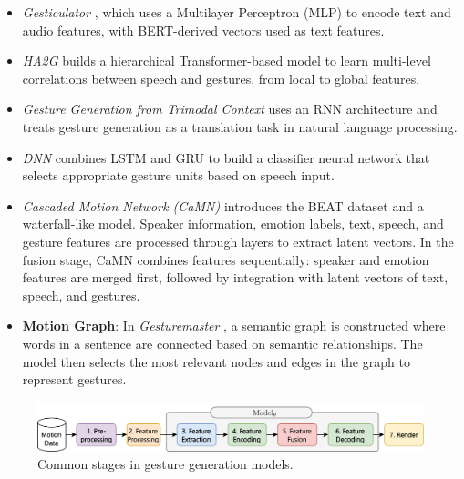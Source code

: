 \begin{itemize}
	\item \textit{Gesticulator} \cite{kucherenko2020gesticulator}, which uses a Multilayer Perceptron (MLP) to encode text and audio features, with BERT-derived vectors used as text features.
	
	\item \textit{HA2G} \cite{liu2022learning} builds a hierarchical Transformer-based model to learn multi-level correlations between speech and gestures, from local to global features.
	
	\item \textit{Gesture Generation from Trimodal Context} \cite{yoon2020speech} uses an RNN architecture and treats gesture generation as a translation task in natural language processing.
	
	\item \textit{DNN} \cite{chiu2015predicting} combines LSTM and GRU to build a classifier neural network that selects appropriate gesture units based on speech input.
	
	\item \textit{Cascaded Motion Network (CaMN)} \cite{liu2022beat} introduces the BEAT dataset and a waterfall-like model. Speaker information, emotion labels, text, speech, and gesture features are processed through layers to extract latent vectors. In the fusion stage, CaMN combines features sequentially: speaker and emotion features are merged first, followed by integration with latent vectors of text, speech, and gestures.
	
	\item \textbf{Motion Graph}: In \textit{Gesturemaster} \cite{zhou2022gesturemaster}, a semantic graph is constructed where words in a sentence are connected based on semantic relationships. The model then selects the most relevant nodes and edges in the graph to represent gestures.
\end{itemize}



\begin{figure}[htbp]
	\centering
	\includegraphics[width=0.9\linewidth]{figures/CommonStage.png}
	\caption{Common stages in gesture generation models.}
	\label{fig:CommonStage}
\end{figure}

